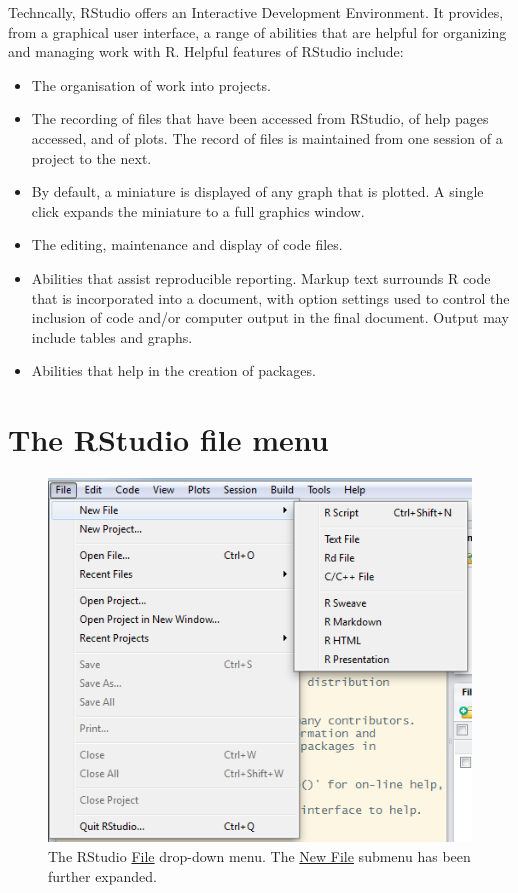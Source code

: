 \documentclass{tufte-book}\usepackage[]{graphicx}\usepackage[]{color}
\begin{document}
Techncally, 
RStudio offers an Interactive Development Environment.  It
provides, from a graphical user interface, a range of abilities that
are helpful for organizing and managing work with R.  Helpful features
of RStudio include:
\begin{itemize}
\item The organisation of work into projects.
\item The recording of files that have been accessed from RStudio, of
  help pages accessed, and of plots.  The record of files is
  maintained from one session of a project to the next.
\item By default, a miniature is displayed of any graph that is
  plotted.  A single click expands the miniature to a full graphics
  window.
\item The editing, maintenance and display of code files.
\item Abilities that assist reproducible reporting.
     Markup text
  surrounds R code that is incorporated into a document, with option
  settings used to control the inclusion of code and/or computer
  output in the final document. Output may include tables and graphs.
\item Abilities that help in the creation of packages.
\end{itemize}

\section{The RStudio file menu}

\begin{figure}
\includegraphics{figs-inc/03i-menu.png}
\caption{The RStudio \underline{File} drop-down menu.  The
  \underline{New File} submenu has been further expanded.}\label{fig:file-menu}
\end{figure}
\end{document}
